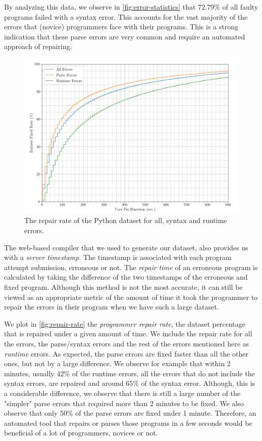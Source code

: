 By analyzing this data, we observe in \autoref{fig:error-statistics} that $72.79
\% $ of all faulty programs failed with a syntax error. This accounts for the
vast majority of the errors that (novice) programmers face with their programs.
This is a strong indication that these parse errors are very common and require
an automated approach of repairing.

\begin{figure}[h]
  \centering
  \includegraphics[width=0.9\linewidth]{repair-rate-all-parse.png}
  \caption{The repair rate of the Python dataset for all, syntax and runtime
  errors.}
  \label{fig:repair-rate}
\end{figure}

 The web-based compiler that we used to generate our
dataset, also provides us with a \emph{server timestamp}. The timestamp is
associated with each program attempt submission, erroneous or not. The
\emph{repair time} of an erroneous program is calculated by taking the
difference of the two timestamps of the erroneous and fixed program. Although
this method is not the most accurate, it can still be viewed as an appropriate
metric of the amount of time it took the programmer to repair the errors in
their program when we have such a large dataset.

We plot in \autoref{fig:repair-rate} the \emph{programmer repair rate}, \ie the
dataset percentage that is repaired under a given amount of time. We include the
repair rate for all the errors, the parse/syntax errors and the rest of the
errors mentioned here as \emph{runtime} errors. As expected, the parse errors
are fixed faster than all the other ones, but not by a large difference. We
observe for example that within 2 minutes, usually $42 \%$ of the runtime
errors, \ie all the errors that do not include the syntax errors, are repaired
and around $65 \%$ of the syntax error. Although, this is a considerable
difference, we observe that there is still a large number of the "simpler" parse
errors that required more than 2 minutes to be fixed. We also observe that only
$50 \%$ of the parse errors are fixed under 1 minute. Therefore, an automated
tool that repairs or parses those programs in a few seconds would be beneficial
of a lot of programmers, novices or not.

